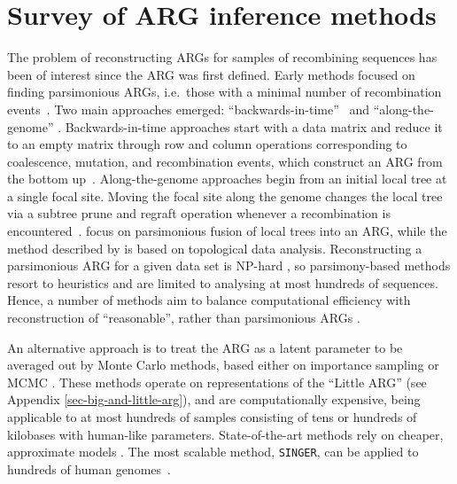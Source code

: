 \documentclass[9pt,twocolumn,twoside]{gsajnl}
\begin{document}
\section{Survey of ARG inference methods}
\label{sec-survey-arg-infer}
The problem of reconstructing ARGs for samples of recombining sequences has
been of interest since the ARG was first defined. Early methods focused on
finding parsimonious ARGs, i.e.\ those with a minimal number of
recombination events~\citep{hein1990reconstructing}. Two main approaches
emerged: ``backwards-in-time''~\citep{lyngso2005minimum} and
``along-the-genome'' \citep{song2003parsimonious, song2005constructing}.
Backwards-in-time approaches
start with a data matrix and reduce it to an empty matrix through row
and column operations corresponding to coalescence, mutation, and recombination
events, which construct an ARG from the bottom up~\citep{song2005efficient,
wu2008association,thao2019hybrid,ignatieva2021kwarg}.
Along-the-genome approaches
begin from an initial local tree at a single focal site.
Moving the focal site along the
genome changes the local tree via a subtree prune and regraft
operation whenever a recombination is encountered~\citep{hein1993heuristic,
wu2011new, mirzaei2017rent}.
\citet{rasmussen2022espalier} focus on parsimonious fusion of local
trees into an ARG, while the method described by
\citet{camara2016inference} is based on topological data analysis.
Reconstructing a parsimonious ARG for a given data set is NP-hard
\citep{wang2001perfect}, so parsimony-based methods resort to heuristics and
are limited to analysing at most hundreds of sequences. Hence, a number of
methods aim to balance computational efficiency with reconstruction of
``reasonable'', rather than parsimonious ARGs
\citep{minichiello2006mapping,
parida2008estimating, kelleher2019inferring,  speidel2019method,
schaefer2021ancestral, zhang2023biobank}.


An alternative approach is to treat the ARG as a latent parameter to be
averaged out by Monte Carlo methods, based either on importance sampling
\citep{griffiths1996ancestral, fearnhead2001estimating, jenkins2011inference}
or MCMC \citep{kuhner2000maximum, kuhner2006lamarc, nielsen2000estimation, wang2008bayesian,
wang2009population, fallon2013acg, vaughan2017inferring, mahmoudi2022bayesian}.
These methods operate on representations
of the ``Little ARG'' (see Appendix \ref{sec-big-and-little-arg}), and are computationally expensive, being
applicable to at most hundreds of samples consisting of tens or hundreds of
kilobases with human-like parameters.
State-of-the-art methods rely on cheaper,
approximate models \citep{didelot2010inference, heine2018bridging,
hubisz2020mapping,hubisz2020inference, medina2020speeding,deng2024robust}. 
The most scalable
method, \texttt{SINGER}, can be applied to
hundreds of human genomes~\citep{deng2024robust}.
\end{document}
